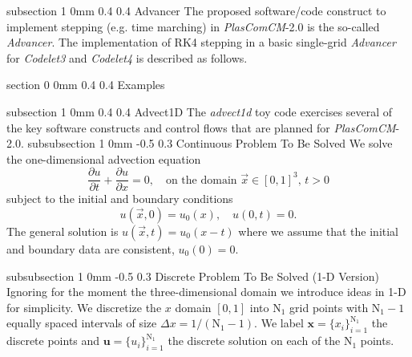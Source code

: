 \documentclass[11pt]{article}
\makeatletter
\renewcommand{\section}{\@startsection
{section}%
{0}%
{0mm}%
{0.4\baselineskip}%
{0.4\baselineskip}%
{\normalfont\Large\bfseries\color{myBrown}}}%
\renewcommand{\subsection}{\@startsection
{subsection}%
{1}%
{0mm}%
{0.4\baselineskip}%
{0.4\baselineskip}%
{\normalfont\large\bfseries\color{myBrown}}}%
\renewcommand{\subsubsection}{\@startsection
{subsubsection}%
{1}%
{0mm}%
{-0.5\baselineskip}%
{0.3\baselineskip}%
{\normalfont\normalsize\itshape\centering\color{myBrown}}}%
\newcommand{\dancode}{\emph{PlasComCM}}
\newcommand{\bvec}[1]{\ensuremath{\boldsymbol{#1}}}
\makeatother
\begin{document}
\subsection{Advancer}
The proposed software/code construct to implement stepping (e.g. time marching) in \dancode-2.0 is the so-called \textit{Advancer}. The implementation of RK4 stepping in a basic single-grid \textit{Advancer} for \textit{Codelet3} and \textit{Codelet4}  is described as follows.



\newpage
\section{Examples}

\subsection{Advect1D}
The \textit{advect1d} toy code exercises several of the key software constructs and control flows that are planned for \dancode-2.0. 
\subsubsection{Continuous Problem To Be Solved}
We solve the one-dimensional advection equation
\begin{equation}
\frac{\partial u}{\partial t} + \frac{\partial u}{\partial x} = 0, \quad \text{on the domain $\vec{x} \in [0,1]^3, \, t>0$}
\label{eqn:adv}
\end{equation}
subject to the initial and boundary conditions
\begin{equation}
u(\vec{x},0) = u_0(x), \quad u(0,t) = 0.
\label{eqn:bc}
\end{equation}
The general solution is $u(\vec{x},t) = u_0(x - t)$ where we assume that the initial and boundary data are consistent, $u_0(0) = 0$.

\subsubsection{Discrete Problem To Be Solved (1-D Version)}
Ignoring for the moment the three-dimensional domain we introduce ideas in 1-D for simplicity.  We discretize the $x$ domain $[0,1]$ into $\text{N}_1$ grid points with $\text{N}_1-1$ equally spaced intervals of size $\Delta x = 1/(\text{N}_1-1)$.  We label $\bvec{x} = \{x_i\}_{i=1}^{\text{N}_1}$ the discrete points and $\bvec{u} = \{u_i\}_{i=1}^{\text{N}_1}$ the discrete solution on each of the $\text{N}_1$ points.  
\end{document}
